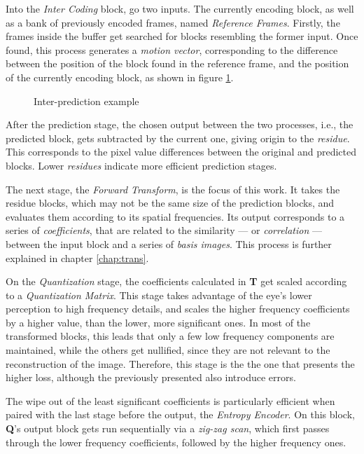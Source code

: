 Into the \emph{Inter Coding} block, go two inputs. The currently encoding block, as well as a bank of previously encoded frames, named \emph{Reference Frames}. Firstly, the frames inside the buffer get searched for blocks resembling the former input. Once found, this process generates a \emph{motion vector}, corresponding to the difference between the position of the block found in the reference frame, and the position of the currently encoding block, as shown in figure \ref{fig:interex}.

\begin{figure}[!htbp]
    \centering
    
    \caption{Inter-prediction example}
    \label{fig:interex}
\end{figure}

After the prediction stage, the chosen output between the two processes, i.e., the predicted block, gets subtracted by the current one, giving origin to the \emph{residue}. This corresponds to the pixel value differences between the original and predicted blocks. Lower \emph{residues} indicate more efficient prediction stages.

The next stage, the \emph{Forward Transform}, is the focus of this work. It takes the residue blocks, which may not be the same size of the prediction blocks, and evaluates them according to its spatial frequencies. Its output corresponds to a series of \emph{coefficients}, that are related to the similarity --- or \emph{correlation} --- between the input block and a series of \emph{basis images}. This process is further explained in chapter \ref{chap:trans}.

On the \emph{Quantization} stage, the coefficients calculated in \textbf{T} get scaled according to a \emph{Quantization Matrix}. This stage takes advantage of the eye's lower perception to high frequency details, and scales the higher frequency coefficients by a higher value, than the lower, more significant ones. In most of the transformed blocks, this leads that only a few low frequency components are maintained, while the others get nullified, since they are not relevant to the reconstruction of the image. Therefore, this stage is the the one that presents the higher loss, although the previously presented also introduce errors.

The wipe out of the least significant coefficients is particularly efficient when paired with the last stage before the output, the \emph{Entropy Encoder}. On this block, \textbf{Q}'s output block gets run sequentially via a \emph{zig-zag scan}, which first passes through the lower frequency coefficients, followed by the higher frequency ones. 

